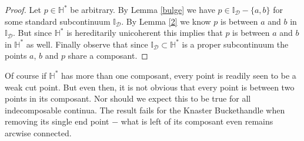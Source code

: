 \documentclass[12pt]{article}
\theoremstyle{plain}
\theoremstyle{definition}
\newcommand{\II}{\ensuremath{\mathbb I}}
\newcommand{\HH}{\ensuremath{\mathbb H}}
\newcommand{\0}{\ensuremath{\varnothing}}
\newcommand{\cD}{\ensuremath{\mathcal D}}
\begin{document}
	\begin{proof}
		Let $p \in \HH^*$ be arbitrary. By Lemma \ref{bulge} we have $p \in \II_\cD - \{a,b\}$ for some standard subcontinuum $\II_\cD$. By Lemma \ref{2} we know $p$ is between $a$ and $b$ in $\II_\cD$. But since $\HH^*$ is hereditarily unicoherent this implies that $p$ is between $a$ and $b$ in $\HH^*$ as well. Finally observe that since $\II_\cD  \subset \HH^*$ is a proper subcontinuum the points $a$, $b$ and $p$ share a composant.
	\end{proof}
	
	
	Of course if $\HH^*$ has more than one composant, every point is readily seen to be a weak cut point. But even then, it is not obvious that every point is between two points in its composant. Nor should we expect this to be true for all indecomposable continua. The result fails for the Knaster Buckethandle when removing its single end point $-$ what is left of its composant even remains arcwise connected.\\
	
\end{document}
